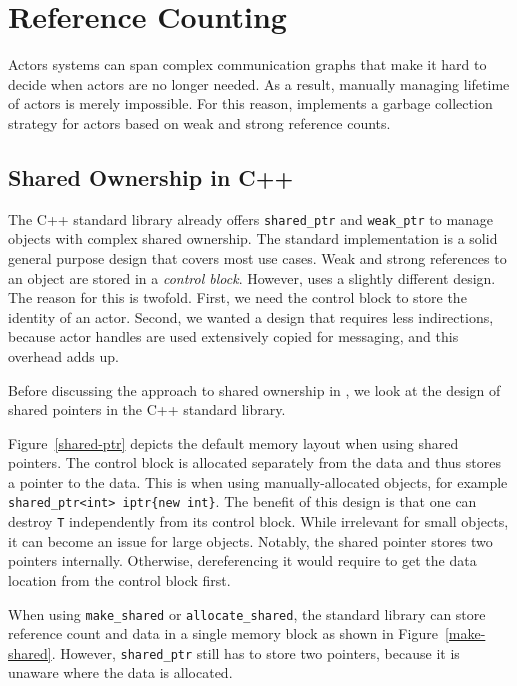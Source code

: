 \section{Reference Counting}
\label{reference-counting}

Actors systems can span complex communication graphs that make it hard to decide when actors are no longer needed. As a result, manually managing lifetime of actors is merely impossible. For this reason, \lib implements a garbage collection strategy for actors based on weak and strong reference counts.

\subsection{Shared Ownership in C++}

The C++ standard library already offers \lstinline^shared_ptr^ and \lstinline^weak_ptr^ to manage objects with complex shared ownership. The standard implementation is a solid general purpose design that covers most use cases. Weak and strong references to an object are stored in a \emph{control block}. However, \lib uses a slightly different design. The reason for this is twofold. First, we need the control block to store the identity of an actor. Second, we wanted a design that requires less indirections, because actor handles are used extensively copied for messaging, and this overhead adds up.

Before discussing the approach to shared ownership in \lib, we look at the design of shared pointers in the C++ standard library.


Figure~\ref{shared-ptr} depicts the default memory layout when using shared pointers. The control block is allocated separately from the data and thus stores a pointer to the data. This is when using manually-allocated objects, for example \lstinline^shared_ptr<int> iptr{new int}^. The benefit of this design is that one can destroy \lstinline^T^ independently from its control block. While irrelevant for small objects, it can become an issue for large objects. Notably, the shared pointer stores two pointers internally. Otherwise, dereferencing it would require to get the data location from the control block first.


When using \lstinline^make_shared^ or \lstinline^allocate_shared^, the standard library can store reference count and data in a single memory block as shown in Figure~\ref{make-shared}. However, \lstinline^shared_ptr^ still has to store two pointers, because it is unaware where the data is allocated.

